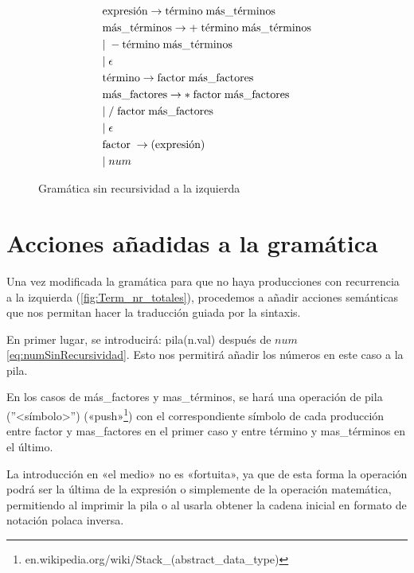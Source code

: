 \documentclass[a4paper,twocolumn]{article}
\begin{document}
    \begin{figure}
        \begin{align}
            \label{eqc:gramaticaCorregida}
            &\text{expresión} \rightarrow \text{término} \; \text{más\_términos} \\
            &\text{más\_términos} \rightarrow  + \;\text{término} \; \text{más\_términos}
            \refstepcounter{equation}\nonumber  \\
            &\vert \; - \text{término} \; \text{más\_términos} \\
            &\vert \; \epsilon \\
            &\text{término} \rightarrow \text{factor} \; \text{más\_factores} \\
            &\text{más\_factores} \rightarrow  * \;\text{factor} \; \text{más\_factores} \\
            &\vert \; / \; \text{factor} \; \text{más\_factores} \\
            &\vert \; \epsilon \\
            &\text{factor} \; \rightarrow (\text{expresión})\\
            &\vert \; num\label{eq:numSinRecursividad}
        \end{align}
        \caption{Gramática sin recursividad a la izquierda}
        \label{fig:Term_nr_totales}
    \end{figure}


    \section{Acciones añadidas a la gramática}\label{sec:acciones-anadidas-a-la-gramatica}
    Una vez modificada la gramática para que no haya producciones con recurrencia a la izquierda (\autoref{fig:Term_nr_totales}), procedemos a añadir acciones semánticas que nos permitan hacer la traducción guiada por la sintaxis.


    En primer lugar, se introducirá: pila(n.val) después de $num$\eqref{eq:numSinRecursividad}.
    Esto nos permitirá añadir los números en este caso a la pila.

    En los casos de más\_factores y mas\_términos, se hará una operación de pila (''<símbolo>'') («push»\footnote{en.wikipedia.org/wiki/Stack\_(abstract\_data\_type)}) con el correspondiente símbolo de cada producción entre factor y mas\_factores en el primer caso y entre término y mas\_términos en el último.

    La introducción en «el medio» no es «fortuita», ya que de esta forma la operación podrá ser la última de la expresión o simplemente de la operación matemática, permitiendo al imprimir la pila o al usarla obtener la cadena inicial en formato de notación polaca inversa.
\end{document}
